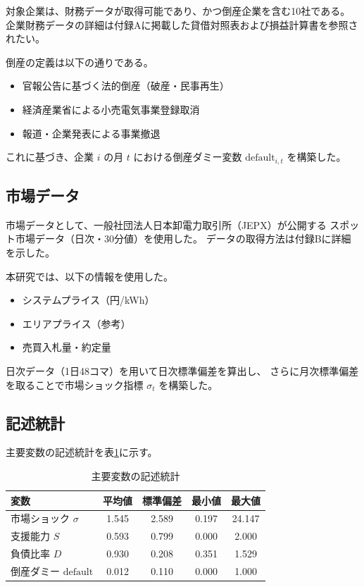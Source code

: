 対象企業は、財務データが取得可能であり、かつ倒産企業を含む10社である。
企業財務データの詳細は付録Aに掲載した貸借対照表および損益計算書を参照されたい。

倒産の定義は以下の通りである。

\begin{itemize}
  \item 官報公告に基づく法的倒産（破産・民事再生）
  \item 経済産業省による小売電気事業登録取消
  \item 報道・企業発表による事業撤退
\end{itemize}

これに基づき、企業 $i$ の月 $t$ における倒産ダミー変数
$\text{default}_{i,t}$ を構築した。

\subsection{市場データ}

市場データとして、一般社団法人日本卸電力取引所（JEPX）が公開する
スポット市場データ（日次・30分値）を使用した。
データの取得方法は付録Bに詳細を示した。

本研究では、以下の情報を使用した。

\begin{itemize}
  \item システムプライス（円/kWh）
  \item エリアプライス（参考）
  \item 売買入札量・約定量
\end{itemize}

日次データ（1日48コマ）を用いて日次標準偏差を算出し、
さらに月次標準偏差を取ることで市場ショック指標 $\sigma_t$ を構築した。

\subsection{記述統計}

主要変数の記述統計を表\ref{tab:desc_stats}に示す。

\begin{table}[H]
\centering
\caption{主要変数の記述統計}
\label{tab:desc_stats}
\begin{tabular}{lcccc}
\toprule
変数 & 平均値 & 標準偏差 & 最小値 & 最大値 \\
\midrule
市場ショック $\sigma$ & 1.545 & 2.589 & 0.197 & 24.147 \\
支援能力 $S$ & 0.593 & 0.799 & 0.000 & 2.000 \\
負債比率 $D$ & 0.930 & 0.208 & 0.351 & 1.529 \\
倒産ダミー $\text{default}$ & 0.012 & 0.110 & 0.000 & 1.000 \\
\bottomrule
\end{tabular}
\end{table}


